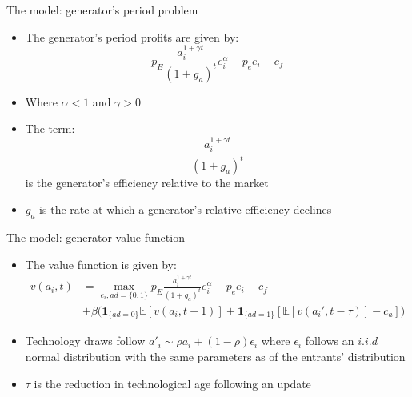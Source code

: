 \documentclass{beamer}
\begin{document}
\begin{frame}{The model: generator's period problem}\label{gen_problem}
\begin{itemize}
\item The generator's period profits are given by:
\begin{equation*}
    p_E\frac{a_{i}^{1+\gamma t}}{(1+g_a)^t} e_i^\alpha -p_e e_i-c_f
\end{equation*}

\item Where $\alpha<1$ and $\gamma>0$
 \item The term: \begin{equation*}
     \frac{a_{i}^{1+\gamma t}}{(1+g_a)^t}
 \end{equation*} is the generator's efficiency relative to the market
 \item $g_a$ is the rate at which a generator's relative efficiency declines
    
\end{itemize}

 \hyperlink{intra_period}{}  
 \hyperlink{alt_model}{}   
  \hyperlink{effic_between_model}{}
  \hyperlink{coal_gas}{}  

    
\end{frame}
\begin{frame}{The model: generator value function}\label{value_fn}
\begin{itemize}
\item The value function is given by:
\begin{align*} 
    v(a_{i},t) &= \max_{e_i,ad=\{0,1\}} p_E\frac{a_{i}^{1+\gamma t}}{(1+g_a)^t} e_i^\alpha -p_e e_i-c_f\\ 
    &+\beta \big(\mathbf{1}_{\{ad =0\}} \mathbb{E}[v(a_{i},t+1)]  + \mathbf{1}_{\{ad =1\}}[ \mathbb{E}[v(a_{i}',t-\tau)]-c_a]\big)
\end{align*}
\hfill\break
    \item Technology draws follow $a'_i\sim \rho a_i + (1-\rho)\epsilon_i$ where $\epsilon_i$ follows an $i.i.d$ normal distribution with the same parameters as of the entrants' distribution
     \item $\tau$ is the reduction in technological age following an update
    
\end{itemize}

 \hyperlink{intra_period}{}  
 \hyperlink{alt_model}{}   
  \hyperlink{effic_between_model}{}
\hyperlink{coal_gas}{}    
    
\end{frame}
\end{document}
